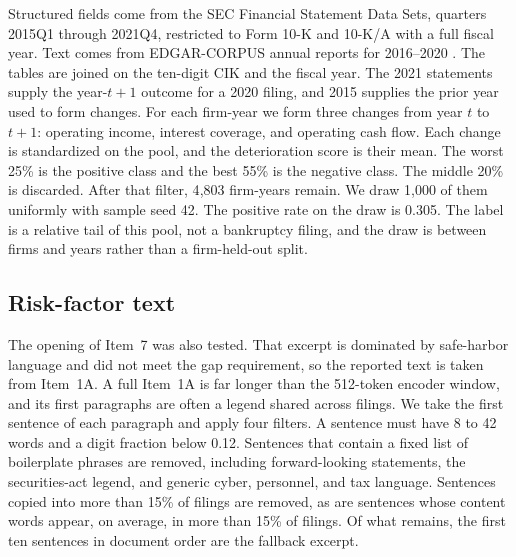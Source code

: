 \documentclass{article}
\begin{document}
Structured fields come from the SEC Financial Statement Data Sets, quarters 2015Q1 through 2021Q4, restricted to Form 10-K and 10-K/A with a full fiscal year.
Text comes from EDGAR-CORPUS annual reports for 2016--2020 \citep{loukas2021edgar}.
The tables are joined on the ten-digit CIK and the fiscal year.
The 2021 statements supply the year-$t{+}1$ outcome for a 2020 filing, and 2015 supplies the prior year used to form changes.
For each firm-year we form three changes from year $t$ to $t{+}1$: operating income, interest coverage, and operating cash flow.
Each change is standardized on the pool, and the deterioration score is their mean.
The worst 25\% is the positive class and the best 55\% is the negative class.
The middle 20\% is discarded.
After that filter, 4{,}803 firm-years remain.
We draw 1{,}000 of them uniformly with sample seed 42.
The positive rate on the draw is 0.305.
The label is a relative tail of this pool, not a bankruptcy filing, and the draw is between firms and years rather than a firm-held-out split.

\subsection{Risk-factor text}

The opening of Item~7 was also tested. That excerpt is dominated by safe-harbor language and did not meet the gap requirement, so the reported text is taken from Item~1A.
A full Item~1A is far longer than the 512-token encoder window, and its first paragraphs are often a legend shared across filings.
We take the first sentence of each paragraph and apply four filters.
A sentence must have 8 to 42 words and a digit fraction below 0.12.
Sentences that contain a fixed list of boilerplate phrases are removed, including forward-looking statements, the securities-act legend, and generic cyber, personnel, and tax language.
Sentences copied into more than 15\% of filings are removed, as are sentences whose content words appear, on average, in more than 15\% of filings.
Of what remains, the first ten sentences in document order are the fallback excerpt.
\end{document}
